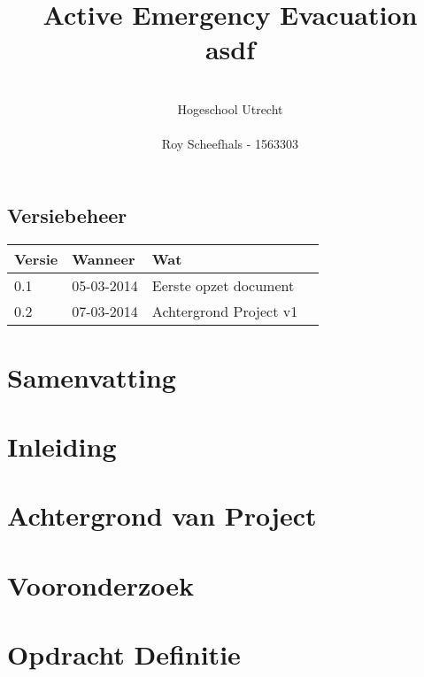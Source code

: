 \documentclass{../local}
\title{\textbf{Active Emergency Evacuation}\\asdf}
\author{\\
		Hogeschool Utrecht\\
		\\
		Roy Scheefhals - 1563303}
\begin{document}
 
\maketitle
\newpage\null\thispagestyle{empty}

\renewcommand{\thesection}{\Roman{section}}

\section*{Versiebeheer}
\begin{tabular}{ | l | l | l | p{7.5cm} |}
\hline
Versie & Wanneer & Wat \\ \hline
0.1 & 05-03-2014 & Eerste opzet document\\ \hline
0.2 & 07-03-2014 & Achtergrond Project v1\\ \hline

\end{tabular}
\clearpage

\chapter{Samenvatting}

\clearpage

\chapter{Inleiding}

\clearpage

\newpage\null\thispagestyle{empty}

\renewcommand{\thesection}{\arabic{section}}

\thispagestyle{empty}
\setcounter{page}{0}
\tableofcontents
\clearpage

\chapter{Achtergrond van Project} 


\chapter{Vooronderzoek}


\chapter{Opdracht Definitie}


%
%


%
\end{document}
